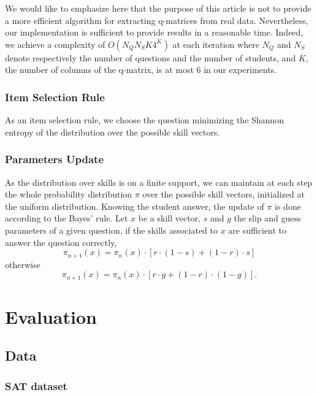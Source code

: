 \documentclass{sig-alternate}
\newcommand\alert[1]{\textcolor{red}{#1}}
\begin{document}

We would like to emphasize here that the purpose of this article is not to provide a more efficient algorithm for extracting q-matrices from real data. Nevertheless, our implementation is sufficient to provide results in a reasonable time. Indeed, we achieve a complexity of $O(N_Q N_S K 4^K)$ at each iteration where $N_Q$ and $N_S$ denote respectively the number of questions and the number of students, and $K$, the number of columns of the q-matrix, is at most 6 in our experiments.

\subsubsection{Item Selection Rule}

As an item selection rule, we choose the question minimizing the Shannon entropy of the distribution over the possible skill vectors.

\subsubsection{Parameters Update}

As the distribution over skills is on a finite support, we can maintain at each step the whole probability distribution $\pi$ over the possible skill vectors, initialized at the uniform distribution.
Knowing the student answer, the update of $\pi$ is done according to the Bayes' rule. Let $x$ be a skill vector, $s$ and $g$ the slip and guess parameters of a given question, if the skills associated to $x$ are sufficient to answer the question correctly,
\[ \pi_{n+1}(x) = \pi_n(x) \cdot [r\cdot(1-s) + (1-r)\cdot s] \]
otherwise
\[ \pi_{n+1}(x) = \pi_n(x) \cdot [r\cdot g + (1-r)\cdot(1-g)]. \]

\section{Evaluation}

\subsection{Data} %

\subsubsection{SAT dataset}
\end{document}
